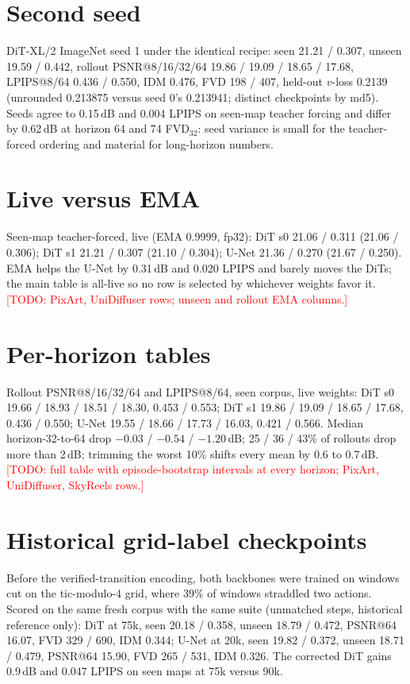 \documentclass[10pt]{article}
\newcommand{\todo}[1]{\textcolor{red}{[TODO: #1]}}
\begin{document}



\appendix
\section{Second seed}\label{app:seed}
DiT-XL/2 ImageNet seed 1 under the identical recipe: seen 21.21 / 0.307, unseen 19.59 / 0.442, rollout PSNR@8/16/32/64 19.86 / 19.09 / 18.65 / 17.68, LPIPS@8/64 0.436 / 0.550, IDM 0.476, FVD 198 / 407, held-out $v$-loss 0.2139 (unrounded 0.213875 versus seed 0's 0.213941; distinct checkpoints by md5). Seeds agree to 0.15\,dB and 0.004 LPIPS on seen-map teacher forcing and differ by 0.62\,dB at horizon 64 and 74 FVD$_{32}$: seed variance is small for the teacher-forced ordering and material for long-horizon numbers.

\section{Live versus EMA}\label{app:ema}
Seen-map teacher-forced, live (EMA 0.9999, fp32): DiT s0 21.06 / 0.311 (21.06 / 0.306); DiT s1 21.21 / 0.307 (21.10 / 0.304); U-Net 21.36 / 0.270 (21.67 / 0.250). EMA helps the U-Net by 0.31\,dB and 0.020 LPIPS and barely moves the DiTs; the main table is all-live so no row is selected by whichever weights favor it. \todo{PixArt, UniDiffuser rows; unseen and rollout EMA columns.}

\section{Per-horizon tables}\label{app:horizon}
Rollout PSNR@8/16/32/64 and LPIPS@8/64, seen corpus, live weights: DiT s0 19.66 / 18.93 / 18.51 / 18.30, 0.453 / 0.553; DiT s1 19.86 / 19.09 / 18.65 / 17.68, 0.436 / 0.550; U-Net 19.55 / 18.66 / 17.73 / 16.03, 0.421 / 0.566. Median horizon-32-to-64 drop $-0.03$ / $-0.54$ / $-1.20$\,dB; 25 / 36 / 43\% of rollouts drop more than 2\,dB; trimming the worst 10\% shifts every mean by 0.6 to 0.7\,dB. \todo{full table with episode-bootstrap intervals at every horizon; PixArt, UniDiffuser, SkyReels rows.}

\section{Historical grid-label checkpoints}\label{app:grid}
Before the verified-transition encoding, both backbones were trained on windows cut on the tic-modulo-4 grid, where 39\% of windows straddled two actions. Scored on the same fresh corpus with the same suite (unmatched steps, historical reference only): DiT at 75k, seen 20.18 / 0.358, unseen 18.79 / 0.472, PSNR@64 16.07, FVD 329 / 690, IDM 0.344; U-Net at 20k, seen 19.82 / 0.372, unseen 18.71 / 0.479, PSNR@64 15.90, FVD 265 / 531, IDM 0.326. The corrected DiT gains 0.9\,dB and 0.047 LPIPS on seen maps at 75k versus 90k.
\end{document}
